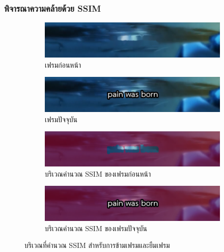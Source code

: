 \documentclass[xcolor=dvipsnames, xetex,serif]{beamer}
\numberwithin{equation}{section}
\begin{document}
    \begin{frame}
        \frametitle{พิจารณาความคล้ายด้วย SSIM}
        \begin{figure}[H]
            \centering
            \begin{subfigure}{0.4\linewidth}
                \centering
                \includegraphics[width=0.95\linewidth]{images/skipborrow/prevframe.png}
                \caption{เฟรมก่อนหน้า}
                \label{image:ssim_location_prev}
            \end{subfigure}
            \begin{subfigure}{0.4\linewidth}
                \centering
                \includegraphics[width=0.95\linewidth]{images/skipborrow/currentframe.png}
                \caption{เฟรมปัจจุบัน}
                \label{image:ssim_location_curr}
            \end{subfigure}
            \bigskip
            \begin{subfigure}{0.4\linewidth}
                \centering
                \includegraphics[width=0.95\linewidth]{images/skipborrow/prevframeinverse.png}
                \caption{บริเวณคำนวณ SSIM ของเฟรมก่อนหน้า}
                \label{image:ssim_location_prev_inv}
            \end{subfigure}
            \begin{subfigure}{0.4\linewidth}
                \centering
                \includegraphics[width=0.95\linewidth]{images/skipborrow/currentframeinverse.png}
                \caption{บริเวณคำนวณ SSIM ของเฟรมปัจจุบัน}
                \label{image:ssim_location_curr_inv}
            \end{subfigure}
            \caption{บริเวณที่คำนวณ SSIM สำหรับการข้ามเฟรมและยืมเฟรม}
            \label{image:ssim_location}
        \end{figure}
    \end{frame}
\end{document}
